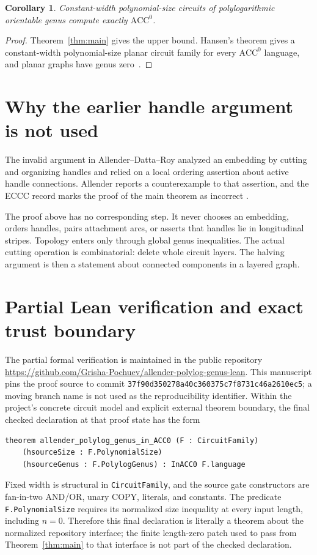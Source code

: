 \documentclass[11pt]{article}
\newtheorem{corollary}[theorem]{Corollary}
\theoremstyle{definition}
\newcommand{\ACC}{\mathrm{ACC}^{0}}
\begin{document}
\begin{corollary}\label{cor:equality}
Constant-width polynomial-size circuits of polylogarithmic orientable genus
compute exactly $\ACC$.
\end{corollary}

\begin{proof}
Theorem~\ref{thm:main} gives the upper bound.  Hansen's theorem gives a
constant-width polynomial-size planar circuit family for every $\ACC$ language,
and planar graphs have genus zero~\cite{Hansen2006}.
\end{proof}

\section{Why the earlier handle argument is not used}\label{sec:oldproof}

The invalid argument in Allender--Datta--Roy analyzed an embedding by cutting
and organizing handles and relied on a local ordering assertion about active
handle connections.  Allender reports a counterexample to that assertion, and
the ECCC record marks the proof of the main theorem as incorrect
\cite{Allender2023,ECCCComment2025}.

The proof above has no corresponding step.  It never chooses an embedding,
orders handles, pairs attachment arcs, or asserts that handles lie in
longitudinal stripes.  Topology enters only through global genus inequalities.
The actual cutting operation is combinatorial: delete whole circuit layers.
The halving argument is then a statement about connected components in a
layered graph.

\section{Partial Lean verification and exact trust boundary}\label{sec:lean}

The partial formal verification is maintained in the public repository
\url{https://github.com/Grisha-Pochuev/allender-polylog-genus-lean}.  This
manuscript pins the proof source to commit
\nolinkurl{37f90d350278a40c360375c7f8731c46a2610ec5}; a moving branch name is
not used as the reproducibility identifier.  Within the project's concrete
circuit model and explicit external theorem boundary, the final checked
declaration at that proof state has the form
\begin{verbatim}
theorem allender_polylog_genus_in_ACC0 (F : CircuitFamily)
    (hsourceSize : F.PolynomialSize)
    (hsourceGenus : F.PolylogGenus) : InACC0 F.language
\end{verbatim}
Fixed width is structural in \texttt{CircuitFamily}, and the source gate
constructors are fan-in-two AND/OR, unary COPY, literals, and constants.  The
predicate \texttt{F.PolynomialSize} requires its normalized size inequality at
every input length, including $n=0$.  Therefore this final declaration is
literally a theorem about the normalized repository interface; the finite
length-zero patch used to pass from Theorem~\ref{thm:main} to that interface is
not part of the checked declaration.
\end{document}

